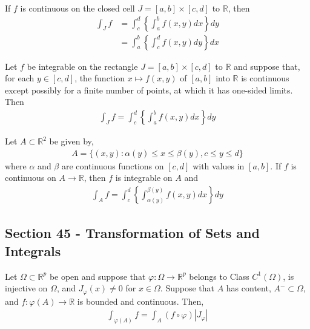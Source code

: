 \documentclass[12pt]{article}
\newcommand{\R}{\mathbb{R}}
\newenvironment{theorem}[2][Theorem]{\begin{trivlist}
\item[\hskip \labelsep {\bfseries #1}\hskip \labelsep {\bfseries #2.}]}{\end{trivlist}}
\begin{document}
\begin{theorem}{44.12}
If $f$ is continuous on the closed cell $J = [a, b] \times [c, d]$ to $\R$, then
\begin{align*}
\int_J f &= \int_c^d \left\{\int_a^b f(x, y) dx \right\} dy\\
&= \int_a^b \left\{ \int_c^d f(x, y) dy \right\} dx
\end{align*}
\end{theorem}

\begin{theorem}{44.13}
Let $f$ be integrable on the rectangle $J = [a, b] \times [c, d]$ to $\R$ and suppose that, for each $y \in [c, d]$, the function $x \mapsto f(x, y)$ of $[a, b]$ into $\R$ is continuous except possibly for a finite number of points, at which it has one-sided limits. Then
\begin{align*}
\int_J f = \int_c^d \left\{ \int_a^b f(x, y) dx \right\} dy
\end{align*}
\end{theorem}

\begin{theorem}{44.14}
Let $A \subset \R^2$ be given by,
\begin{align*}
A = \{(x, y): \alpha(y) \leq x \leq \beta(y), c \leq y \leq d\}
\end{align*}
where $\alpha$ and $\beta$ are continuous functions on $[c, d]$ with values in $[a, b]$. If $f$ is continuous on $A \to \R$, then $f$ is integrable on $A$ and
\begin{align*}
\int_A f = \int_c^d \left\{ \int_{\alpha(y)}^{\beta(y)} f(x, y) dx \right\} dy
\end{align*}
\end{theorem}

\subsection*{Section 45 - Transformation of Sets and Integrals}

\begin{theorem}[Change of Variables]{Theorem}
Let $\Omega \subset \R^p$ be open and suppose that $\varphi: \Omega \to \R^p$ belongs to Class $C^1(\Omega)$, is injective on $\Omega$, and $J_{\varphi}(x) \neq 0$ for $x \in \Omega$. Suppose that $A$ has content, $A^- \subset \Omega$, and $f: \varphi(A) \to \R$ is bounded and continuous. Then,
\begin{align*}
\int_{\varphi(A)} f = \int_A (f \circ \varphi) |J_{\varphi}|
\end{align*}
\end{theorem}
\end{document}
